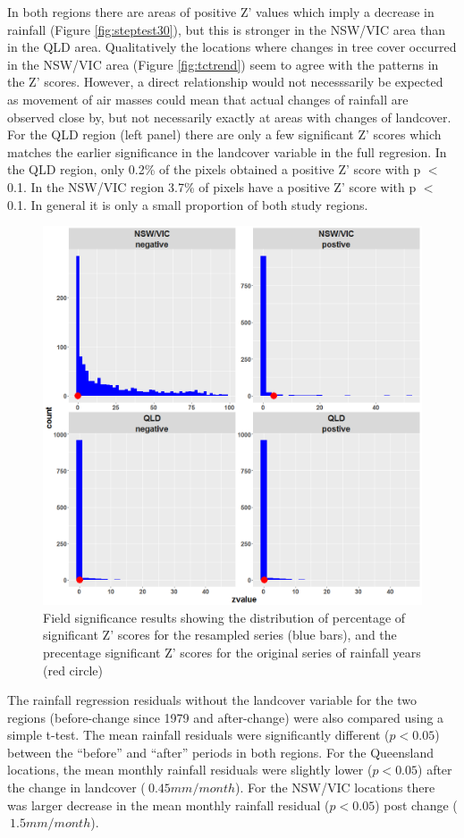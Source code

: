 \documentclass[fleqn,10pt,lineno]{wlpeerj} %
\theoremstyle{definition}
\theoremstyle{definition}
\theoremstyle{definition}
\theoremstyle{remark}
\begin{document}
In both regions there are areas of positive Z' values which imply a
decrease in rainfall (Figure \ref{fig:steptest30}), but this is stronger
in the NSW/VIC area than in the QLD area. Qualitatively the locations
where changes in tree cover occurred in the NSW/VIC area (Figure
\ref{fig:tctrend}) seem to agree with the patterns in the Z' scores.
However, a direct relationship would not necesssarily be expected as
movement of air masses could mean that actual changes of rainfall are
observed close by, but not necessarily exactly at areas with changes of
landcover. For the QLD region (left panel) there are only a few
significant Z' scores which matches the earlier significance in the
landcover variable in the full regresion. In the QLD region, only 0.2\%
of the pixels obtained a positive Z' score with p \(<\) 0.1. In the
NSW/VIC region 3.7\% of pixels have a positive Z' score with p \(<\)
0.1. In general it is only a small proportion of both study regions.

\begin{figure}
\includegraphics[width=0.7\linewidth]{figures/bt4_hist} \caption{Field significance results showing the distribution of percentage of significant Z' scores for the resampled series (blue bars), and the precentage significant Z' scores for the original series of rainfall years (red circle)}\label{fig:fieldsig}
\end{figure}

The rainfall regression residuals without the landcover variable for the
two regions (before-change since 1979 and after-change) were also
compared using a simple t-test. The mean rainfall residuals were
significantly different (\(p < 0.05\)) between the ``before'' and
``after'' periods in both regions. For the Queensland locations, the
mean monthly rainfall residuals were slightly lower (\(p < 0.05\)) after
the change in landcover (\(~ 0.45 mm/month\)). For the NSW/VIC locations
there was larger decrease in the mean monthly rainfall residual
(\(p < 0.05\)) post change (\(~ 1.5 mm/month\)).
\end{document}
